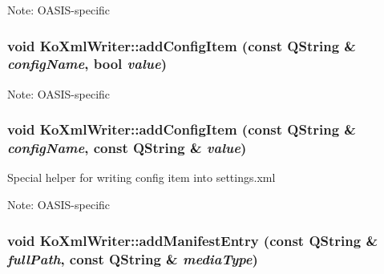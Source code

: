 \begin{Desc}
\item[Note:]OASIS-specific \end{Desc}
\hypertarget{classKoXmlWriter_2d1cc2de755ca456ca0f5bd8d81414ce}{
\subsubsection[{addConfigItem}]{\setlength{\rightskip}{0pt plus 5cm}void KoXmlWriter::addConfigItem (const QString \& {\em configName}, \/  bool {\em value})}}
\label{classKoXmlWriter_2d1cc2de755ca456ca0f5bd8d81414ce}


\begin{Desc}
\item[Note:]OASIS-specific \end{Desc}
\hypertarget{classKoXmlWriter_edfa20fc47c415db42871b8ff0d97e8d}{
\subsubsection[{addConfigItem}]{\setlength{\rightskip}{0pt plus 5cm}void KoXmlWriter::addConfigItem (const QString \& {\em configName}, \/  const QString \& {\em value})}}
\label{classKoXmlWriter_edfa20fc47c415db42871b8ff0d97e8d}


Special helper for writing config item into settings.xml \begin{Desc}
\item[Note:]OASIS-specific \end{Desc}
\hypertarget{classKoXmlWriter_168885626dde5e2432e9a2789b70715a}{
\subsubsection[{addManifestEntry}]{\setlength{\rightskip}{0pt plus 5cm}void KoXmlWriter::addManifestEntry (const QString \& {\em fullPath}, \/  const QString \& {\em mediaType})}}
\label{classKoXmlWriter_168885626dde5e2432e9a2789b70715a}


